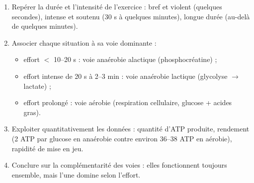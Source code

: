 \documentclass[11pt]{article}
\newcommand{\cle}[1]{{\popxbold\color{popdark}#1}}
\begin{document}
\begin{methode}
\begin{enumerate}
\item \cle{Repérer la durée et l'intensité} de l'exercice : bref et violent (quelques secondes), intense et soutenu (30 s à quelques minutes), longue durée (au-delà de quelques minutes).
\item \cle{Associer chaque situation à sa voie dominante} :
\begin{itemize}
\item effort $<$ 10--20 s : voie \cle{anaérobie alactique} (phosphocréatine) ;
\item effort intense de 20 s à 2--3 min : voie \cle{anaérobie lactique} (glycolyse $\to$ lactate) ;
\item effort prolongé : voie \cle{aérobie} (respiration cellulaire, glucose + acides gras).
\end{itemize}
\item \cle{Exploiter quantitativement} les données : quantité d'ATP produite, rendement (2 ATP par glucose en anaérobie contre environ 36--38 ATP en aérobie), rapidité de mise en jeu.
\item \cle{Conclure} sur la complémentarité des voies : elles fonctionnent toujours ensemble, mais l'une domine selon l'effort.
\end{enumerate}
\end{methode}
\end{document}
